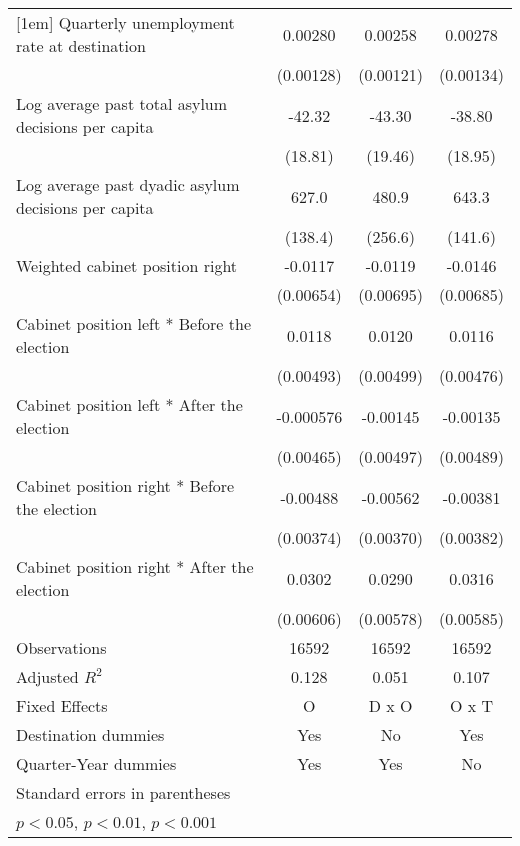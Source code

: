 \begin{table}[htbp]
\begin{tabular}{l*{3}{c}}
[1em]
Quarterly unemployment rate at destination&     0.00280\sym{*}  &     0.00258\sym{*}  &     0.00278\sym{*}  \\
                    &   (0.00128)         &   (0.00121)         &   (0.00134)         \\
[1em]
Log average past total asylum decisions per capita&      -42.32\sym{*}  &      -43.30\sym{*}  &      -38.80\sym{*}  \\
                    &     (18.81)         &     (19.46)         &     (18.95)         \\
[1em]
Log average past dyadic asylum decisions per capita&       627.0\sym{***}&       480.9         &       643.3\sym{***}\\
                    &     (138.4)         &     (256.6)         &     (141.6)         \\
[1em]
Weighted cabinet position right&     -0.0117         &     -0.0119         &     -0.0146\sym{*}  \\
                    &   (0.00654)         &   (0.00695)         &   (0.00685)         \\
[1em]
Cabinet position left * Before the election&      0.0118\sym{*}  &      0.0120\sym{*}  &      0.0116\sym{*}  \\
                    &   (0.00493)         &   (0.00499)         &   (0.00476)         \\
[1em]
Cabinet position left * After the election&   -0.000576         &    -0.00145         &    -0.00135         \\
                    &   (0.00465)         &   (0.00497)         &   (0.00489)         \\
[1em]
Cabinet position right * Before the election&    -0.00488         &    -0.00562         &    -0.00381         \\
                    &   (0.00374)         &   (0.00370)         &   (0.00382)         \\
[1em]
Cabinet position right * After the election&      0.0302\sym{***}&      0.0290\sym{***}&      0.0316\sym{***}\\
                    &   (0.00606)         &   (0.00578)         &   (0.00585)         \\
\hline
Observations        &       16592         &       16592         &       16592         \\
Adjusted \(R^{2}\)  &       0.128         &       0.051         &       0.107         \\
Fixed Effects       &           O         &       D x O         &       O x T         \\
Destination dummies &         Yes         &          No         &         Yes         \\
Quarter-Year dummies&         Yes         &         Yes         &          No         \\
\hline\hline
\multicolumn{4}{l}{\footnotesize Standard errors in parentheses}\\
\multicolumn{4}{l}{\footnotesize \sym{*} \(p<0.05\), \sym{**} \(p<0.01\), \sym{***} \(p<0.001\)}\\
\end{tabular}
\end{table}
